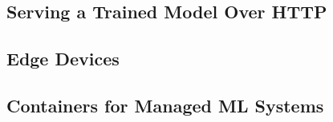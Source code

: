 \subsection*{Serving a Trained Model Over HTTP}




































\subsection{Edge Devices}









\subsection{Containers for Managed ML Systems}


